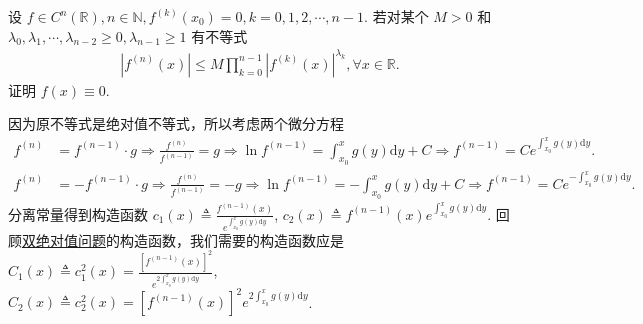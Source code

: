 \documentclass[../../main.tex]{subfiles}
\begin{document}
\begin{example}
设 $f \in C^n(\mathbb{R}), n \in \mathbb{N}, f^{(k)}(x_0) = 0, k = 0, 1, 2, \cdots, n - 1$. 若对某个 $M > 0$ 和 $\lambda_0, \lambda_1, \cdots, \lambda_{n - 2} \geq 0, \lambda_{n - 1} \geq 1$ 有不等式
\begin{align*}
|f^{(n)}(x)| \leq M \prod_{k = 0}^{n - 1} |f^{(k)}(x)|^{\lambda_k}, \forall x \in \mathbb{R}.
\end{align*}
证明 $f(x) \equiv 0$.
\end{example}
\begin{note}
因为原不等式是绝对值不等式，所以考虑两个微分方程
\begin{align*}
f^{(n)} &= f^{(n-1)} \cdot g \Rightarrow \frac{f^{(n)}}{f^{(n-1)}} = g \Rightarrow \ln f^{(n-1)} = \int_{x_0}^x g(y) \mathrm{d}y + C \Rightarrow f^{(n-1)} = C e^{\int_{x_0}^x g(y) \mathrm{d}y}.
\end{align*}
\begin{align*}
f^{(n)} &= -f^{(n-1)} \cdot g \Rightarrow \frac{f^{(n)}}{f^{(n-1)}} = -g \Rightarrow \ln f^{(n-1)} = -\int_{x_0}^x g(y) \mathrm{d}y + C \Rightarrow f^{(n-1)} = C e^{-\int_{x_0}^x g(y) \mathrm{d}y}.
\end{align*}
分离常量得到构造函数 $c_1(x) \triangleq \frac{f^{(n-1)}(x)}{e^{\int_{x_0}^x g(y) \mathrm{d}y}}$, $c_2(x) \triangleq f^{(n-1)}(x) e^{\int_{x_0}^x g(y) \mathrm{d}y}$.
回顾\hyperref[subsection:双绝对值问题]{双绝对值问题}的构造函数，我们需要的构造函数应是 $C_1(x) \triangleq c_1^2(x) = \frac{[f^{(n-1)}(x)]^2}{e^{2\int_{x_0}^x g(y) \mathrm{d}y}}$, $C_2(x) \triangleq c_2^2(x) = [f^{(n-1)}(x)]^2 e^{2\int_{x_0}^x g(y) \mathrm{d}y}$.
\end{note}
\end{document}
